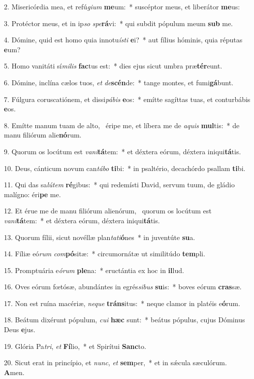 2. Misericórdia mea, et refú\textit{gi}\textit{um} \textbf{me}um:~*  suscéptor meus, et liberátor \textbf{me}us:\

3. Protéctor meus, et in ip\textit{so} \textit{spe}\textbf{rá}vi:~*  qui subdit pópulum meum \textbf{sub} me.\

4. Dómine, quid est homo quia innotu\textit{ís}\textit{ti} \textbf{e}i?~*  aut fílius hóminis, quia réputas \textbf{e}um?\

5. Homo vanitáti sí\textit{mi}\textit{lis} \textbf{fac}tus est:~*  dies ejus sicut umbra præ\textbf{tér}eunt.\

6. Dómine, inclína cælos tuos, \textit{et} \textit{de}\textbf{scén}de:~*  tange montes, et fumi\textbf{gá}bunt.\

7. Fúlgura coruscatiónem, et dissi\textit{pá}\textit{bis} \textbf{e}os:~*  emítte sagíttas tuas, et conturbábis \textbf{e}os.\

8. Emítte manum tuam de alto, \dag\  éripe me, et líbera me de \textit{a}\textit{quis} \textbf{mul}tis:~*  de manu filiórum alie\textbf{nó}rum.\

9. Quorum os locútum est \textit{va}\textit{ni}\textbf{tá}tem:~*  et déxtera eórum, déxtera iniqui\textbf{tá}tis.\

10. Deus, cánticum novum can\textit{tá}\textit{bo} \textbf{ti}bi:~*  in psaltério, decachórdo psallam \textbf{ti}bi.\

11. Qui das sa\textit{lú}\textit{tem} \textbf{ré}gibus:~*  qui redemísti David, servum tuum, de gládio malígno: éri\textbf{pe} me.\

12. Et érue me de manu filiórum alienórum, \dag\  quorum os locútum est \textit{va}\textit{ni}\textbf{tá}tem:~*  et déxtera eórum, déxtera iniqui\textbf{tá}tis.\

13. Quorum fílii, sicut novéllæ plan\textit{ta}\textit{ti}\textbf{ó}nes~*  in juventúte \textbf{su}a.\

14. Fíliæ eó\textit{rum} \textit{com}\textbf{pó}sitæ:~*  circumornátæ ut similitúdo \textbf{tem}pli.\

15. Promptuária e\textit{ó}\textit{rum} \textbf{ple}na:~*  eructántia ex hoc in \textbf{il}lud.\

16. Oves eórum fœtósæ, abundántes in egrés\textit{si}\textit{bus} \textbf{su}is:~*  boves eórum \textbf{cras}sæ.\

17. Non est ruína macériæ, \textit{ne}\textit{que} \textbf{tráns}itus:~*  neque clamor in platéis e\textbf{ó}rum.\

18. Beátum dixérunt pópulum, \textit{cu}\textit{i} \textbf{hæc} sunt:~*  beátus pópulus, cujus Dóminus Deus \textbf{e}jus.\

19. Glória Pa\textit{tri}, \textit{et} \textbf{Fí}lio,~*  et Spirítui \textbf{Sanc}to.\

20. Sicut erat in princípio, et \textit{nunc}, \textit{et} \textbf{sem}per,~*  et in sǽcula sæculórum. \textbf{A}men.\


